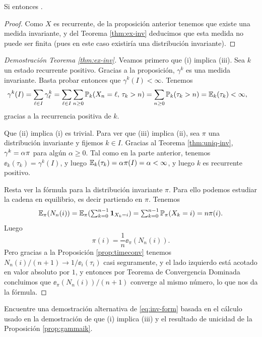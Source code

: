 \begin{cor}\label{cor:recnul}
Si  entonces .
\end{cor}

\begin{proof}
Como $X$ es recurrente, de la proposición anterior tenemos que existe una medida invariante, y del Teorema \ref{thm:ex-inv} deducimos que esta medida no puede ser finita (pues en este caso existiría una distribución invariante).
\end{proof}

\begin{proof}[Demostración Teorema \ref{thm:ex-inv}]
Veamos primero que (i) implica (iii).
Sea $k$ un estado recurrente positivo.
Gracias a la proposición, $\gamma^k$ es una medida invariante.
Basta probar entonces que $\gamma^k(I)<\infty$.
Tenemos
\begin{align}
\gamma^k(I)&=\sum_{\ell\in I}\gamma^k_\ell=\sum_{\ell\in I}\sum_{n\geq0}\mathbb{P}_k(X_n=\ell,\,\tau_k>n)=\sum_{n\geq0}\mathbb{P}_k(\tau_k>n)=\mathbb{E}_k(\tau_k)<\infty,
\end{align}
gracias a la recurrencia positiva de $k$.

Que (ii) implica (i) es trivial.
Para ver que (iii) implica (ii), sea $\pi$ una distribución invariante y fijemos $k\in I$.
Gracias al Teorema \ref{thm:uniq-inv}, $\gamma^k=\alpha\hspace{0.05em}\pi$ para algún $\alpha\geq0$.
Tal como en la parte anterior, tenemos $\ee_k(\tau_k)=\gamma^k(I)$, y luego $\mathbb{E}_k(\tau_k)=\alpha\hspace{0.05em}\pi(I)=\alpha<\infty$, y luego $k$ es recurrente positivo.

Resta ver la fórmula para la distribución invariante $\pi$.
Para ello podemos estudiar la cadena en equilibrio, es decir partiendo en $\pi$.
Tenemos
\[\textstyle\mathbb{E}_\pi(N_n(i))=\mathbb{E}_\pi(\sum_{k=0}^{n-1}\mathbf{1}_{X_k=i})=\sum_{k=0}^{n-1}\mathbb{P}_\pi(X_k=i)=n\pi(i).\]
Luego 
\[\pi(i)=\frac1{n}\ee_\pi(N_n(i)).\]
Pero gracias a la Proposición \ref{prop:timeconv} tenemos $N_n(i)/(n+1)\longrightarrow1/\ee_i(\tau_i)$ casi seguramente, y el lado izquierdo está acotado en valor absoluto por $1$, y entonces por Teorema de Convergencia Dominada concluimos que $\ee_\pi(N_n(i))/(n+1)$ converge al mismo número, lo que nos da la fórmula.
\end{proof}

\begin{exer}\label{exer:inv-form-alt} 
Encuentre una demostración alternativa de \eqref{eq:inv-form} basada en el cálculo usado en la demostración de que (i) implica (iii) y el resultado de unicidad de la Proposición \ref{prop:gammaik}.
\end{exer}

